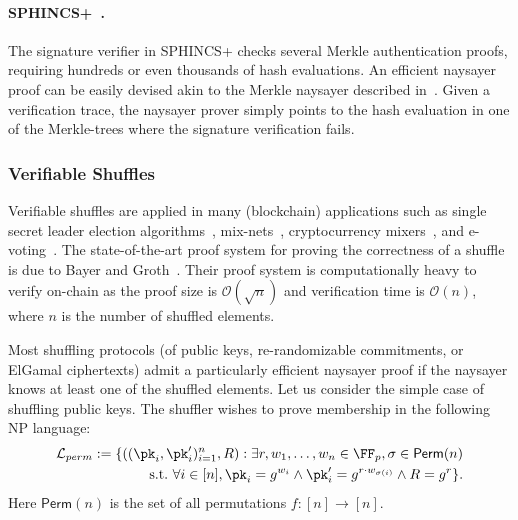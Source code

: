 \paragraph{SPHINCS+~\cite{CCS:BHKNRS19}.} The signature verifier in SPHINCS+ checks several Merkle authentication proofs, requiring hundreds or even thousands of hash evaluations. An efficient naysayer proof can be easily devised akin to the Merkle naysayer described in~. Given a verification trace, the naysayer prover simply points to the hash evaluation in one of the Merkle-trees where the signature verification fails. 

\subsubsection{Verifiable Shuffles}\label{sec:vshuffle_naysayer}
Verifiable shuffles are applied in many (blockchain) applications such as single secret leader election algorithms~\cite{AFT:Boneh20}, mix-nets~\cite{CACM:Chaum81}, cryptocurrency mixers~\cite{EPRINT:SNBB19}, and e-voting~\cite{USENIX:Adida08}. The state-of-the-art proof system for proving the correctness of a shuffle is due to Bayer and Groth~\cite{EC:BayGro12}. Their proof system is computationally heavy to verify on-chain as the proof size is $\mathcal{O}(\sqrt{n})$ and verification time is $\mathcal{O}(n)$, where $n$ is the number of shuffled elements. 

Most shuffling protocols (of public keys, re-randomizable commitments, or ElGamal ciphertexts) admit a particularly efficient naysayer proof if the naysayer knows at least one of the shuffled elements. Let us consider the simple case of shuffling public keys. The shuffler wishes to prove membership in the following  NP language:
\begin{align*}%
    \Lang_{perm}:= \{ ((\pk_i,\pk_i')_{i=1}^n,R) : \exists r,\witness_1,\dots,\witness_n \in \FF_p, \sigma \in\mathsf{Perm}(n) \\
    \suchthat \forall i\in[n], \pk_i = g^{\witness_i} \land \pk_i' = g^{r \cdot \witness_{\sigma(i)}} \land R = g^r
    \}.
\end{align*}
Here $\mathsf{Perm}(n)$ is the set of all permutations $f:[n]\rightarrow[n]$.

